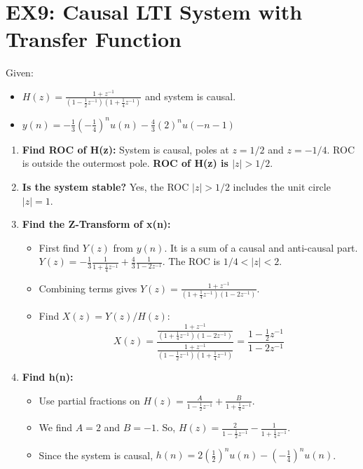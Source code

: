 \documentclass[a4paper,12pt]{article}
\begin{document}
\section*{EX9: Causal LTI System with Transfer Function}
Given:
\begin{itemize}
    \item $H(z) = \frac{1+z^{-1}}{(1-\frac{1}{2}z^{-1})(1+\frac{1}{4}z^{-1})}$ and system is causal.
    \item $y(n) = -\frac{1}{3}(-\frac{1}{4})^n u(n) - \frac{4}{3}(2)^n u(-n-1)$
\end{itemize}
\begin{enumerate}
    \item \textbf{Find ROC of H(z):} System is causal, poles at $z=1/2$ and $z=-1/4$. ROC is outside the outermost pole.
        \textbf{ROC of H(z) is $|z|>1/2$}.
    \item \textbf{Is the system stable?} Yes, the ROC $|z|>1/2$ includes the unit circle $|z|=1$.
    \item \textbf{Find the Z-Transform of x(n):}
        \begin{itemize}
            \item First find $Y(z)$ from $y(n)$. It is a sum of a causal and anti-causal part.
            $Y(z) = -\frac{1}{3}\frac{1}{1+\frac{1}{4}z^{-1}} + \frac{4}{3}\frac{1}{1-2z^{-1}}$. The ROC is $1/4 < |z| < 2$.
            \item Combining terms gives $Y(z) = \frac{1+z^{-1}}{(1+\frac{1}{4}z^{-1})(1-2z^{-1})}$.
            \item Find $X(z) = Y(z)/H(z)$:
            \[ X(z) = \frac{\frac{1+z^{-1}}{(1+\frac{1}{4}z^{-1})(1-2z^{-1})}}{\frac{1+z^{-1}}{(1-\frac{1}{2}z^{-1})(1+\frac{1}{4}z^{-1})}} = \frac{1-\frac{1}{2}z^{-1}}{1-2z^{-1}} \]
        \end{itemize}
    \item \textbf{Find h(n):}
        \begin{itemize}
            \item Use partial fractions on $H(z) = \frac{A}{1-\frac{1}{2}z^{-1}} + \frac{B}{1+\frac{1}{4}z^{-1}}$.
            \item We find $A=2$ and $B=-1$. So, $H(z) = \frac{2}{1-\frac{1}{2}z^{-1}} - \frac{1}{1+\frac{1}{4}z^{-1}}$.
            \item Since the system is causal, $h(n) = 2(\frac{1}{2})^n u(n) - (-\frac{1}{4})^n u(n)$.
        \end{itemize}
\end{enumerate}
\end{document}
